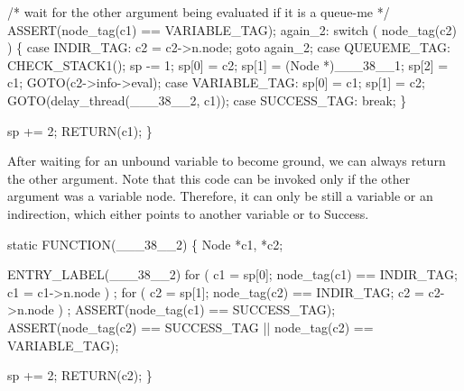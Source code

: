     /* wait for the other argument being evaluated if it is a queue-me */
    ASSERT(node_tag(c1) == VARIABLE_TAG);
 again_2:
    switch ( node_tag(c2) )
    \{
    case INDIR_TAG:
        c2 = c2->n.node;
        goto again_2;
    case QUEUEME_TAG:
        CHECK_STACK1();
        sp   -= 1;
        sp[0] = c2;
        sp[1] = (Node *)___38__1;
        sp[2] = c1;
        GOTO(c2->info->eval);
    case VARIABLE_TAG:
        sp[0] = c1;
        sp[1] = c2;
        GOTO(delay_thread(___38__2, c1));
    case SUCCESS_TAG:
        break;
    \}

    sp += 2;
    RETURN(c1);
\}

\nwendcode{}\nwdocspar
After waiting for an unbound variable to become ground, we can always
return the other argument. Note that this code can be invoked only if
the other argument was a variable node. Therefore, it can only be
still a variable or an indirection, which either points to another
variable or to {\Tt{}Success\nwendquote}.

\nwenddocs{}\plusendmoddef\nwstartdeflinemarkup{}\nwenddeflinemarkup
static
FUNCTION(___38__2)
\{
    Node *c1, *c2;

 ENTRY_LABEL(___38__2)
    for ( c1 = sp[0]; node_tag(c1) == INDIR_TAG; c1 = c1->n.node )
        ;
    for ( c2 = sp[1]; node_tag(c2) == INDIR_TAG; c2 = c2->n.node )
        ;
    ASSERT(node_tag(c1) == SUCCESS_TAG);
    ASSERT(node_tag(c2) == SUCCESS_TAG || node_tag(c2) == VARIABLE_TAG);

    sp += 2;
    RETURN(c2);
\}
\nwendcode{}

%

